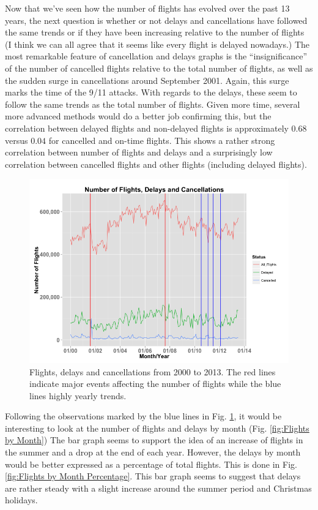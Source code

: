 \documentclass[11pt,twoside,titlepage]{article}
\begin{document}
Now that we've seen how the number of flights has evolved over the past 13 years, the next question is whether or not delays and cancellations have followed the same trends or if they have been increasing relative to the number of flights (I think we can all agree that it seems like every flight is delayed nowadays.) The most remarkable feature of cancellation and delays graphs is the ``insignificance'' of the number of cancelled flights relative to the total number of flights, as well as the sudden surge in cancellations around September 2001. Again, this surge marks the time of the 9/11 attacks. With regards to the delays, these seem to follow the same trends as the total number of flights. Given more time, several more advanced methods would do a better job confirming this, but the correlation between delayed flights and non-delayed flights is approximately $0.68$ versus $0.04$ for cancelled and on-time flights. This shows a rather strong correlation between number of flights and delays and a surprisingly low correlation between cancelled flights and other flights (including delayed flights).

\begin{figure}[h!]
        \centering
                \includegraphics[width=16cm]{Number_of_Flights2.png}
        \caption{Flights, delays and cancellations from 2000 to 2013. The red lines indicate major events affecting the number of flights while the blue lines highly yearly trends.}\label{fig:Number of Flights + Delays}
\end{figure}

Following the observations marked by the blue lines in Fig. \ref{fig:Number of Flights + Delays}, it would be interesting to look at the number of flights and delays by month (Fig. \ref{fig:Flights by Month}) The bar graph seems to support the idea of an increase of flights in the summer and a drop at the end of each year. However, the delays by month would be better expressed as a percentage of total flights. This is done in Fig. \ref{fig:Flights by Month Percentage}. This bar graph seems to suggest that delays are rather steady with a slight increase around the summer period and Christmas holidays.
\end{document}
